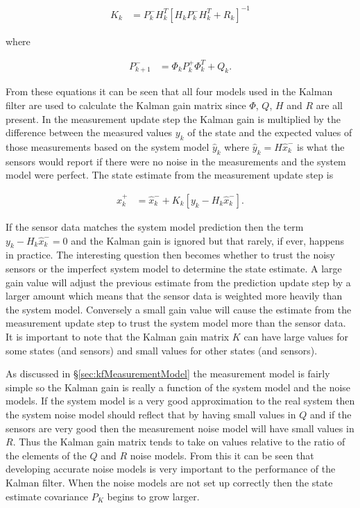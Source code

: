 \begin{align*}
K_k &= P_k^-H_k^T\left[H_kP_k^-H_k^T + R_k\right]^{-1}
\end{align*}

where

\begin{align*}
P_{k+1}^- &= \Phi_kP_k^+\Phi_k^T + Q_k.
\end{align*}

From these equations it can be seen that all four models used in the Kalman filter are used to calculate the Kalman gain matrix since $\Phi$, $Q$, $H$ and $R$ are all present. In the measurement update step the Kalman gain is multiplied by the difference between the measured values $y_k$ of the state and the expected values of those measurements based on the system model $\hat{y}_k$ where $\hat{y}_k = H\hat{x}_k^-$ is what the sensors would report if there were no noise in the measurements and the system model were perfect. The state estimate from the measurement update step is

\begin{align*}
\hat{x}_k^+ &= \hat{x}_k^- + K_k\left[y_k - H_k\hat{x}_k^-\right].
\end{align*}

If the sensor data matches the system model prediction then the term $y_k-H_k\hat{x}_k^-=0$ and the Kalman gain is ignored but that rarely, if ever, happens in practice. The interesting question then becomes whether to trust the noisy sensors or the imperfect system model to determine the state estimate. A large gain value will adjust the previous estimate from the prediction update step by a larger amount which means that the sensor data is weighted more heavily than the system model. Conversely a small gain value will cause the estimate from the measurement update step to trust the system model more than the sensor data. It is important to note that the Kalman gain matrix $K$ can have large values for some states (and sensors) and small values for other states (and sensors).

As discussed in \S\ref{sec:kfMeasurementModel} the measurement model is fairly simple so the Kalman gain is really a function of the system model and the noise models. If the system model is a very good approximation to the real system then the system noise model should reflect that by having small values in $Q$ and if the sensors are very good then the measurement noise model will have small values in $R$. Thus the Kalman gain matrix tends to take on values relative to the ratio of the elements of the $Q$ and $R$ noise models. From this it can be seen that developing accurate noise models is very important to the performance of the Kalman filter. When the noise models are not set up correctly then the state estimate covariance $P_K$ begins to grow larger.

